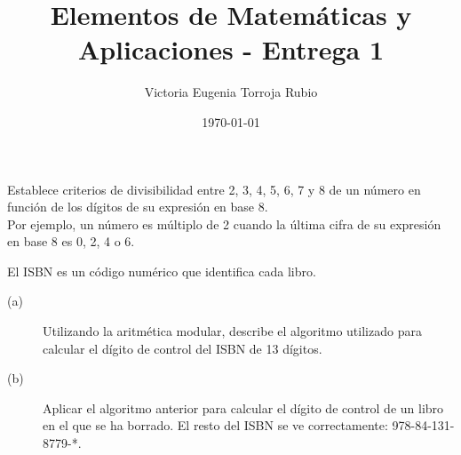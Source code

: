 \documentclass{article}
\begin{document}
\title{Elementos de Matemáticas y Aplicaciones - Entrega 1}
\author{Victoria Eugenia Torroja Rubio}
\date{\today}

\maketitle

\begin{ej}
Establece criterios de divisibilidad entre 2, 3, 4, 5, 6, 7 y 8 de un número en función de los dígitos de su expresión en base 8. \\ 
Por ejemplo, un número es múltiplo de 2 cuando la última cifra de su expresión en base 8 es 0, 2, 4 o 6.
\end{ej}

\begin{ej}
El ISBN es un código numérico que identifica cada libro. 
\begin{description}
\item[(a)] Utilizando la aritmética modular, describe el algoritmo utilizado para calcular el dígito de control del ISBN de 13 dígitos.
\item[(b)] Aplicar el algoritmo anterior para calcular el dígito de control de un libro en el que se ha borrado. El resto del ISBN se ve correctamente: 978-84-131-8779-*. 
\end{description}
\end{ej}
\end{document}
